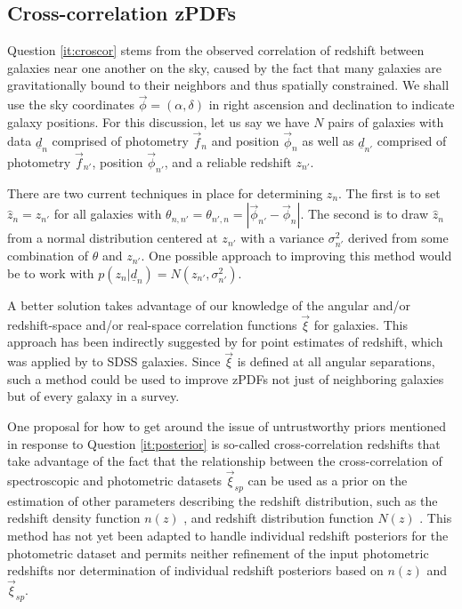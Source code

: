 \documentclass[12pt, onecolumn]{emulateapj}
\newcommand{\textul}{\underline}
\begin{document}
\subsection{Cross-correlation zPDFs}

Question \ref{it:croscor} stems from the observed correlation of redshift between galaxies near one another on the sky, caused by the fact that many galaxies are gravitationally bound to their neighbors and thus spatially constrained.  We shall use the sky coordinates $\vec{\phi}=(\alpha,\delta)$ in right ascension and declination to indicate galaxy positions.  For this discussion, let us say we have $N$ pairs of galaxies with data $\textul{d}_{n}$ comprised of photometry $\vec{f}_{n}$ and position $\vec{\phi}_{n}$ as well as $\textul{d}_{n'}$ comprised of photometry $\vec{f}_{n'}$, position $\vec{\phi}_{n'}$, and a reliable redshift $z_{n'}$.  

There are two current techniques in place for determining $z_{n}$.  The first is to set $\hat{z}_{n}=z_{n'}$ for all galaxies with $\theta_{n,n'}=\theta_{n',n}=|\vec{\phi}_{n'}-\vec{\phi}_{n}|$.  The second is to draw $\hat{z}_{n}$ from a normal distribution centered at $z_{n'}$ with a variance $\sigma^{2}_{n'}$ derived from some combination of $\theta$ and $z_{n'}$.  One possible approach to improving this method would be to work with $p(z_{n}|\textul{d}_{n})=N(z_{n'},\sigma^{2}_{n'})$.

A better solution takes advantage of our knowledge of the angular and/or redshift-space and/or real-space correlation functions $\vec{\xi}$ for galaxies.  This approach has been indirectly suggested by \citet{sch06} for point estimates of redshift, which was applied by \citet{rah14} to SDSS galaxies. Since $\vec{\xi}$ is defined at all angular separations, such a method could be used to improve zPDFs not just of neighboring galaxies but of every galaxy in a survey.  

One proposal for how to get around the issue of untrustworthy priors mentioned in response to Question \ref{it:posterior} is so-called cross-correlation redshifts that take advantage of the fact that the relationship between the cross-correlation of spectroscopic and photometric datasets $\vec{\xi}_{sp}$ can be used as a prior on the estimation of other parameters describing the redshift distribution, such as the redshift density function $n(z)$ \citep{new08}, \citep{men13} and redshift distribution function $N(z)$ \citep{mat10}.  This method has not yet been adapted to handle individual redshift posteriors for the photometric dataset and permits neither refinement of the input photometric redshifts nor determination of individual redshift posteriors based on $n(z)$ and $\vec{\xi}_{sp}$.
\end{document}
